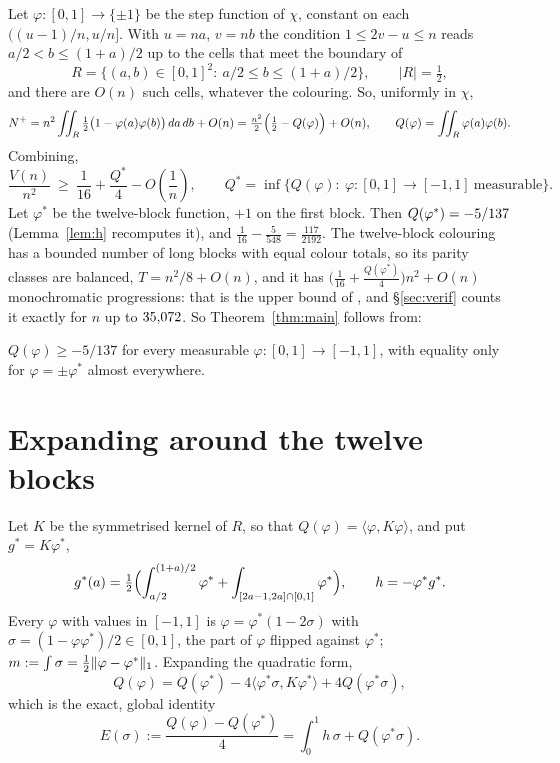 \documentclass[11pt]{article}
\newcommand{\vphi}{\varphi}
\begin{document}
Let $\vphi:[0,1]\to\{\pm1\}$ be the step function of $\chi$, constant on each $((u-1)/n,u/n]$. With $u=na$, $v=nb$ the condition $1\le2v-u\le n$ reads $a/2<b\le(1+a)/2$ up to the cells that meet the boundary of
\[R=\{(a,b)\in[0,1]^2:\ a/2\le b\le(1+a)/2\},\qquad |R|=\tfrac12,\]
and there are $O(n)$ such cells, whatever the colouring. So, uniformly in $\chi$,
\[N^+=n^2\iint_R\tfrac12\bigl(1-\vphi(a)\vphi(b)\bigr)\,da\,db+O(n)=\tfrac{n^2}{2}\Bigl(\tfrac12-Q(\vphi)\Bigr)+O(n),\qquad Q(\vphi)=\iint_R\vphi(a)\vphi(b).\]
Combining,
\begin{equation}\label{eq:red}
\frac{V(n)}{n^2}\ \ge\ \frac1{16}+\frac{Q^*}{4}-O\!\left(\frac1n\right),\qquad Q^*=\inf\bigl\{Q(\vphi):\ \vphi:[0,1]\to[-1,1]\ \text{measurable}\bigr\}.
\end{equation}
Let $\vphi^*$ be the twelve-block function, $+1$ on the first block. Then $Q(\vphi^*)=\QstarVal$ (Lemma~\ref{lem:h} recomputes it), and $\frac1{16}-\frac5{548}=\frac{117}{2192}$. The twelve-block colouring has a bounded number of long blocks with equal colour totals, so its parity classes are balanced, $T=n^2/8+O(n)$, and it has $\bigl(\frac1{16}+\frac{Q(\vphi^*)}{4}\bigr)n^2+O(n)$ monochromatic progressions: that is the upper bound of \cite{PRS}, and \S\ref{sec:verif} counts it exactly for $n$ up to $35{,}072$. So Theorem~\ref{thm:main} follows from:

\begin{theorem}\label{thm:A}
$Q(\vphi)\ge-5/137$ for every measurable $\vphi:[0,1]\to[-1,1]$, with equality only for $\vphi=\pm\vphi^*$ almost everywhere.
\end{theorem}

\section{Expanding around the twelve blocks}\label{sec:expand}

Let $K$ be the symmetrised kernel of $R$, so that $Q(\vphi)=\langle\vphi,K\vphi\rangle$, and put $g^*=K\vphi^*$,
\[g^*(a)=\tfrac12\Bigl(\int_{a/2}^{(1+a)/2}\vphi^*+\int_{[2a-1,2a]\cap[0,1]}\vphi^*\Bigr),\qquad h=-\vphi^*g^*.\]
Every $\vphi$ with values in $[-1,1]$ is $\vphi=\vphi^*(1-2\sigma)$ with $\sigma=(1-\vphi\vphi^*)/2\in[0,1]$, the part of $\vphi$ flipped against $\vphi^*$; $m:=\int\sigma=\frac12\norm{\vphi-\vphi^*}_1$. Expanding the quadratic form,
\[Q(\vphi)=Q(\vphi^*)-4\langle\vphi^*\sigma,K\vphi^*\rangle+4Q(\vphi^*\sigma),\]
which is the exact, global identity
\begin{equation}\label{eq:E}
E(\sigma):=\frac{Q(\vphi)-Q(\vphi^*)}{4}=\int_0^1h\,\sigma+Q(\vphi^*\sigma).
\end{equation}
\end{document}
